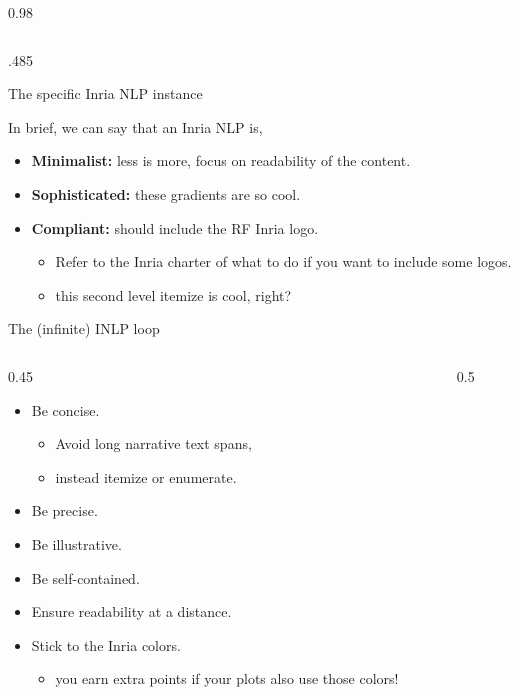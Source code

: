 \documentclass[final,svgnames,english]{beamer}
\begin{document}
\begin{frame}[fragile]{}
\begin{columns}[T]
\begin{column}{0.98\linewidth}
\begin{columns}[T]
\begin{column}{.485\linewidth}
            \begin{inriablock}{The specific Inria NLP instance}

            In brief, we can say that an Inria NLP is,
            \begin{itemize}
              \item \textbf{Minimalist:} less is more, focus on readability of the content.
              \item \textbf{Sophisticated:} these gradients are so cool.
              \item \textbf{Compliant:} should include the RF Inria logo.
              \begin{itemize}
                \item Refer to the Inria charter of what to do if you want to include some logos.
                \item this second level itemize is cool, right?
              \end{itemize}
            \end{itemize}
            \end{inriablock}

\begin{inriablock}{The (infinite) INLP loop}
\begin{columns}[T]
    \begin{column}{0.45\textwidth}
        \begin{itemize}
              \item Be concise.
              \begin{itemize}
                  \item Avoid long narrative text spans,
                  \item instead itemize or enumerate.
              \end{itemize}
              \item Be precise.
              \item Be illustrative.
              \item Be self-contained.
              \item Ensure readability at a distance.
              \item Stick to the Inria colors.
              \begin{itemize}
                  \item you earn extra points if your plots also use those colors!
              \end{itemize}
            \end{itemize}
    \end{column}
    \begin{column}{0.5\textwidth}
        \centering
        
    \end{column}
    \end{columns}
\end{inriablock}


\end{column}
\end{columns}
\end{column}
\end{columns}
\end{frame}
\end{document}
